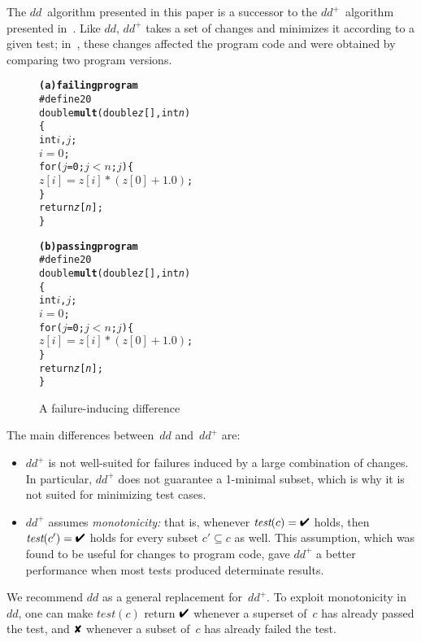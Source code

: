 \documentclass{acm_proc_article-sp}
\newcommand{\PASS}{\text{\ding{52}}\xspace}
\newcommand{\FAIL}{\text{\ding{56}}\xspace}
\newcommand{\edd}{\textit{dd}^+\xspace}
\newcommand{\dd}{\textit{dd}\xspace}
\newcommand{\test}{\textit{test}\xspace}
\theoremstyle{plain}
\begin{document}
The $\dd$~algorithm presented in this paper is a successor to the
$\edd$~algorithm presented in~\cite{zeller/99/esec}.  Like $\dd$,
$\edd$ takes a set of changes and minimizes it according to a given
test; in~\cite{zeller/99/esec}, these changes affected the program
code and were obtained by comparing two program versions.

\begin{figure}[t]
\begin{minipage}{0.48\columnwidth}
\begin{alltt}\rmfamily
\textbf{(a) failing program}\medskip
\#define  20\medskip
double \textbf{mult}(double \textit{z}[], int \textit{n})
\{
   int \(i\), \(j\);\medskip
   \(i = 0\);
   for (\(j\) = 0; \(j < \textit{n}\); \(j\)\text{++}) \{
      \(\textit{z}[i] = \textit{z}[i] * (\textit{z}[0] + 1.0)\);
   \}\smallskip
   return \textit{z}[\textit{n}];
\}\end{alltt}
\end{minipage}
\begin{minipage}{0.48\columnwidth}
\begin{alltt}\rmfamily
\textbf{(b) passing program}\medskip
\#define  20\medskip
double \textbf{mult}(double \textit{z}[], int \textit{n})
\{
   int \(i\), \(j\);\medskip
   \(i = 0\);
   for (\(j\) = 0; \(j < \textit{n}\); \(j\)\text{++}) \{
      \(\textit{z}[i] = \textit{z}[i] * (\textit{z}[0] + 1.0)\);
   \}\smallskip
   return \textit{z}[\textit{n}];
\}\end{alltt}
\end{minipage}
\caption{A failure-inducing difference}
\label{fig:bug.c-dd}
\end{figure}

The main differences between~$\dd$ and~$\edd$ are:
\begin{itemize}
\item $\edd$ is not well-suited for failures induced by a large
  combination of changes.  In particular, $\edd$ does not guarantee a
  1-minimal subset, which is why it is not suited for minimizing test
  cases.
\item $\edd$ assumes \emph{monotonicity:} that is, whenever $\test(c) =
  \PASS$ holds, then $\test(c') = \PASS$ holds for every subset $c' \subseteq
  c$ as well.  This assumption, which was found to be useful for
  changes to program code, gave $\edd$ a better performance when most
  tests produced determinate results.
\end{itemize}
We recommend $\dd$ as a general replacement for~$\edd$.  To exploit
monotonicity in $\dd$, one can make $\test(c)$ return $\PASS$ whenever a
superset of~$c$ has already passed the test, and $\FAIL$ whenever a
subset of~$c$ has already failed the test.
\end{document}
